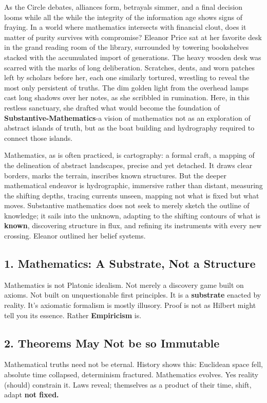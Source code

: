 As the Circle debates, alliances form, betrayals simmer, and a final decision looms while all the while the integrity of the information age shows signs of fraying. In a world where mathematics intersects with financial clout, does it matter of purity survives with compromise?
\newpage
Eleanor Price sat at her favorite desk in the grand reading room of the library, surrounded by towering bookshelves stacked with the accumulated import of generations. The heavy wooden desk was scarred with the marks of long deliberation. Scratches, dents, and worn patches left by scholars before her, each one similarly tortured, wrestling to reveal the most only persistent of truths. The dim golden light from the overhead lamps cast long shadows over her notes, as she scribbled in rumination. Here, in this restless sanctuary, she drafted what would become the foundation of \textbf{Substantive-Mathematics}-a vision of mathematics not as an exploration of abstract islands of truth, but as the boat building and hydrography required to connect those islands.

Mathematics, as is often practiced, is cartography: a formal craft, a mapping of the delineation of abstract landscapes, precise and yet detached. It draws clear borders, marks the terrain, inscribes known structures. But the deeper mathematical endeavor is hydrographic, immersive rather than distant, measuring the shifting depths, tracing currents unseen, mapping not what is fixed but what moves. Substantive mathematics does not seek to merely sketch the outline of knowledge; it sails into the unknown, adapting to the shifting contours of what is \textbf{known}, discovering structure in flux, and refining its instruments with every new crossing. Eleanor outlined her belief systems.

\subsection*{1. Mathematics: A Substrate, Not a Structure}
Mathematics is not Platonic idealism. Not merely a discovery game built on axioms. Not built on unquestionable first principles. It is a \textbf{substrate} enacted by reality. It's axiomatic formalism is mostly illusory. Proof is not as Hilbert might tell you its essence. Rather \textbf{Empiricism}  is.

\subsection*{2. Theorems May Not be so Immutable}
Mathematical truths need not be eternal. History shows this: Euclidean space fell, absolute time collapsed, determinism fractured. Mathematics evolves. Yes reality (should) constrain it. Laws reveal; themselves as a product of their time, shift, adapt \textbf{not fixed.}

